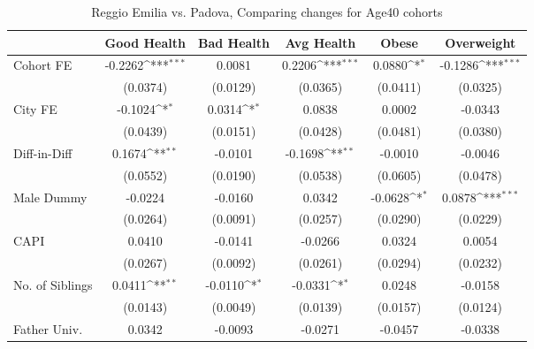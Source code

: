 \begin{table}[htbp]\centering
\def\sym#1{\ifmmode^{#1}\else\(^{#1}\)\fi}
\caption{Reggio Emilia vs. Padova, Comparing changes for Age40 cohorts}
\begin{tabular}{l*{5}{c}}
\toprule
            &\multicolumn{1}{c}{Good Health}&\multicolumn{1}{c}{Bad Health}&\multicolumn{1}{c}{Avg Health}&\multicolumn{1}{c}{Obese}&\multicolumn{1}{c}{Overweight}\\
\midrule
Cohort FE   &     -0.2262\sym{***}&      0.0081         &      0.2206\sym{***}&      0.0880\sym{*}  &     -0.1286\sym{***}\\
            &    (0.0374)         &    (0.0129)         &    (0.0365)         &    (0.0411)         &    (0.0325)         \\
\addlinespace
City FE     &     -0.1024\sym{*}  &      0.0314\sym{*}  &      0.0838         &      0.0002         &     -0.0343         \\
            &    (0.0439)         &    (0.0151)         &    (0.0428)         &    (0.0481)         &    (0.0380)         \\
\addlinespace
Diff-in-Diff&      0.1674\sym{**} &     -0.0101         &     -0.1698\sym{**} &     -0.0010         &     -0.0046         \\
            &    (0.0552)         &    (0.0190)         &    (0.0538)         &    (0.0605)         &    (0.0478)         \\
\addlinespace
Male Dummy  &     -0.0224         &     -0.0160         &      0.0342         &     -0.0628\sym{*}  &      0.0878\sym{***}\\
            &    (0.0264)         &    (0.0091)         &    (0.0257)         &    (0.0290)         &    (0.0229)         \\
\addlinespace
CAPI        &      0.0410         &     -0.0141         &     -0.0266         &      0.0324         &      0.0054         \\
            &    (0.0267)         &    (0.0092)         &    (0.0261)         &    (0.0294)         &    (0.0232)         \\
\addlinespace
No. of Siblings&      0.0411\sym{**} &     -0.0110\sym{*}  &     -0.0331\sym{*}  &      0.0248         &     -0.0158         \\
            &    (0.0143)         &    (0.0049)         &    (0.0139)         &    (0.0157)         &    (0.0124)         \\
\addlinespace
Father Univ.&      0.0342         &     -0.0093         &     -0.0271         &     -0.0457         &     -0.0338         \\

\end{tabular}
\end{table}

